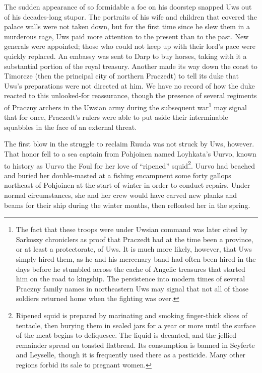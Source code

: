\documentclass[12pt]{report}
\begin{document}
The sudden appearance of so formidable a foe on his doorstep snapped
Uws out of his decades-long stupor.  The portraits of his wife and
children that covered the palace walls were not taken down, but for
the first time since he slew them in a murderous rage, Uws paid more
attention to the present than to the past.  New generals were
appointed; those who could not keep up with their lord's pace were
quickly replaced.  An embassy was sent to Darp to buy horses, taking
with it a substantial portion of the royal treasury.  Another made its
way down the coast to Timorcze (then the principal city of northern
Praczedt) to tell its duke that Uws's preparations were not directed
at him.  We have no record of how the duke reacted to this
unlooked-for reassurance, though the presence of several regiments of
Praczny archers in the Uwsian army during the subsequent
war\footnote{The fact that these troops were under Uwsian command was
later cited by Sarkoszy chroniclers as proof that Praczedt had at the
time been a province, or at least a protectorate, of Uws.  It is much
more likely, however, that Uws simply hired them, as he and his
mercenary band had often been hired in the days before he stumbled
across the cache of Angelic treasures that started him on the road to
kingship.  The persistence into modern times of several Praczny family
names in northeastern Uws may signal that not all of those soldiers
returned home when the fighting was over.} may signal that for once,
Praczedt's rulers were able to put aside their interminable squabbles
in the face of an external threat.

The first blow in the struggle to reclaim Ruuda was not struck by Uws,
however.  That honor fell to a sea captain from Pohjoinen named
Loyhkata's Uurvo, known to history as Uurvo the Foul for her love of
``ripened'' squid\footnote{Ripened squid is prepared by marinating and
smoking finger-thick slices of tentacle, then burying them in sealed
jars for a year or more until the surface of the meat begins to
deliquesce.  The liquid is decanted, and the jellied remainder spread
on toasted flatbread.  Its consumption is banned in Seyferte and
Leyselle, though it is frequently used there as a pesticide.  Many
other regions forbid its sale to pregnant women.}.  Uurvo had beached
and buried her double-masted  at a fishing encampnent some
forty gallops northeast of Pohjoinen at the start of winter in order
to conduct repairs.  Under normal circumstances, she and her crew
would have carved new planks and beams for their ship during the
winter months, then refloated her in the spring.
\end{document}
